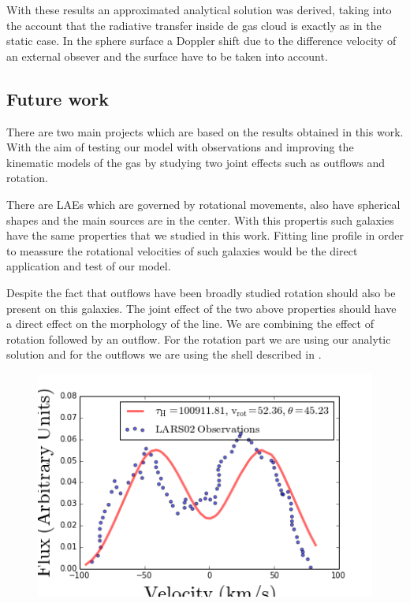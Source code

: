  
With these results an approximated analytical solution was derived, 
taking into the account that the radiative transfer inside de gas
cloud is exactly as in the static case. In the sphere surface
a Doppler shift due to the difference velocity of an external 
obsever and the surface have to be taken into account.  


\subsection{Future work}

There are two main projects which are based on the results obtained in 
this work. With the aim of testing our model with observations and
improving the kinematic models of the gas by studying two joint effects
such as outflows and rotation.  

There are LAEs which are governed by rotational movements, also 
have spherical shapes and the main \ly sources are in the center. 
With this propertis such galaxies have the same properties 
that we studied in this work.  
Fitting \ly line profile in order  to meassure the rotational 
velocities of such galaxies would be the direct application 
and test of our model.

Despite the fact that outflows have been broadly studied rotation should 
also be present on this galaxies. The joint effect of the two above properties 
should have a direct effect on the morphology of the \lya line. We are 
 combining the effect of rotation followed by an outflow. For the rotation 
part we are using our analytic solution and for the outflows we are using 
the shell described in \citep{Verhamme06}.

\begin{figure}[H]\label{fig:LARS}
\begin{center}
\includegraphics[scale=0.8]{../Figures/LARS02_fit.png}
\end{center}
\end{figure}

